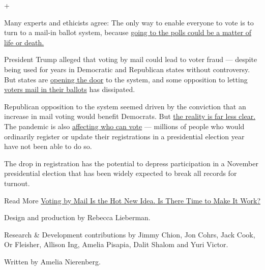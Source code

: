 +

Many experts and ethicists agree: The only way to enable everyone to
vote is to turn to a mail-in ballot system, because
\href{https://www.nytimes3xbfgragh.onion/2020/05/05/magazine/voting-by-mail-2020-covid.html}{going
to the polls could be a matter of life or death.}

President Trump alleged that voting by mail could lead to voter fraud
--- despite being used for years in Democratic and Republican states
without controversy. But states are
\href{https://www.nytimes3xbfgragh.onion/2020/05/21/us/vote-by-mail-trump.html}{opening
the door} to the system, and some opposition to letting
\href{https://www.nytimes3xbfgragh.onion/2020/06/10/us/politics/voting-by-mail-georgia.html}{voters
mail in their ballots} has dissipated.

Republican opposition to the system seemed driven by the conviction that
an increase in mail voting would benefit Democrats. But
\href{https://www.nytimes3xbfgragh.onion/2020/05/25/us/vote-by-mail-coronavirus.html}{the
reality is far less clear.} The pandemic is also
\href{https://www.nytimes3xbfgragh.onion/2020/06/14/us/voter-registration-coronavirus-2020-election.html}{affecting
who can vote} --- millions of people who would ordinarily register or
update their registrations in a presidential election year have not been
able to do so.

The drop in registration has the potential to depress participation in a
November presidential election that has been widely expected to break
all records for turnout.

Read More
\href{https://www.nytimes3xbfgragh.onion/2020/03/19/us/politics/voting-by-mail-coronavirus.html}{Voting
by Mail Is the Hot New Idea. Is There Time to Make It Work?}

Design and production by Rebecca Lieberman.

Research \& Development contributions by Jimmy Chion, Jon Cohrs, Jack
Cook, Or Fleisher, Allison Ing, Amelia Pisapia, Dalit Shalom and Yuri
Victor.

Written by Amelia Nierenberg.

